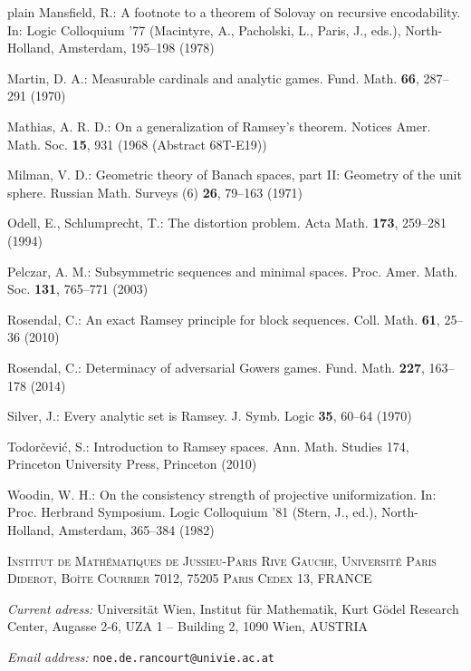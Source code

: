 \documentclass[a4paper,11pt]{article}
\theoremstyle{definition}
\numberwithin{equation}{section}
\begin{document}
\begin{thebibliography}{plain}
Mansfield, R.: 
A footnote to a theorem of {S}olovay on recursive encodability.  
In: Logic Colloquium '77 (Macintyre, A., Pacholski, L., Paris, J., eds.),
North-Holland, Amsterdam, 195--198 (1978)

Martin, D. A.: 
Measurable cardinals and analytic games.
Fund. Math. \textbf{66}, 287--291 (1970)

Mathias, A. R. D.: 
On a generalization of {R}amsey's theorem.
Notices Amer. Math. Soc. \textbf{15}, 931 (1968 (Abstract 68T-E19))

Milman, V. D.: 
Geometric theory of {B}anach spaces, part {II}: {G}eometry of the unit sphere.
Russian Math. Surveys (6) \textbf{26}, 79--163 (1971)

Odell, E., Schlumprecht, T.: 
The distortion problem.
Acta Math. \textbf{173}, 259--281 (1994)

Pelczar, A. M.: 
Subsymmetric sequences and minimal spaces.
Proc. Amer. Math. Soc. \textbf{131}, 765--771 (2003)

Rosendal, C.: 
An exact {R}amsey principle for block sequences.
Coll. Math. \textbf{61}, 25--36 (2010)

Rosendal, C.: 
Determinacy of adversarial {G}owers games.
Fund. Math. \textbf{227}, 163--178 (2014)

Silver, J.: 
Every analytic set is {R}amsey.
J. Symb. Logic \textbf{35}, 60--64 (1970)

Todor\v{c}evi\'c, S.:
Introduction to {R}amsey spaces.
Ann. Math. Studies 174, Princeton University Press, Princeton (2010)

Woodin, W. H.: 
On the consistency strength of projective uniformization.  
In: Proc. Herbrand Symposium. Logic Colloquium '81 (Stern, J., ed.),
North-Holland, Amsterdam, 365--384 (1982)

\end{thebibliography}
    
    \par
  \bigskip
    \textsc{\footnotesize Institut de Math\'ematiques de Jussieu-Paris Rive Gauche, Universit\'e Paris Diderot, Bo\^ite Courrier 7012, 75205 Paris Cedex 13, FRANCE}
    
    \textit{Current adress:} Universit\"at Wien, Institut f\"ur Mathematik, Kurt G\"odel Research Center, Augasse 2-6, UZA 1 -- Building 2, 1090 Wien, AUSTRIA
    
    \textit{Email address:} \texttt{noe.de.rancourt@univie.ac.at}
\end{document}
